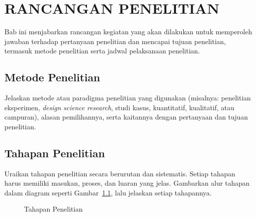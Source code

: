 \chapter{RANCANGAN PENELITIAN}
\label{chap:rancangan}

Bab ini menjabarkan rancangan kegiatan yang akan dilakukan untuk memperoleh jawaban terhadap pertanyaan penelitian dan mencapai tujuan penelitian, termasuk metode penelitian serta jadwal pelaksanaan penelitian.

\section{Metode Penelitian}
Jelaskan metode atau paradigma penelitian yang digunakan (misalnya: penelitian eksperimen, \textit{design science research}, studi kasus, kuantitatif, kualitatif, atau campuran), alasan pemilihannya, serta kaitannya dengan pertanyaan dan tujuan penelitian.

\section{Tahapan Penelitian}
\label{sec:tahapan}
Uraikan tahapan penelitian secara berurutan dan sistematis. Setiap tahapan harus memiliki masukan, proses, dan luaran yang jelas. Gambarkan alur tahapan dalam diagram seperti Gambar~\ref{fig:tahapan}, lalu jelaskan setiap tahapannya.

\begin{figure}[H]
  \centering
  \caption{Tahapan Penelitian}
  \label{fig:tahapan}
\end{figure}

